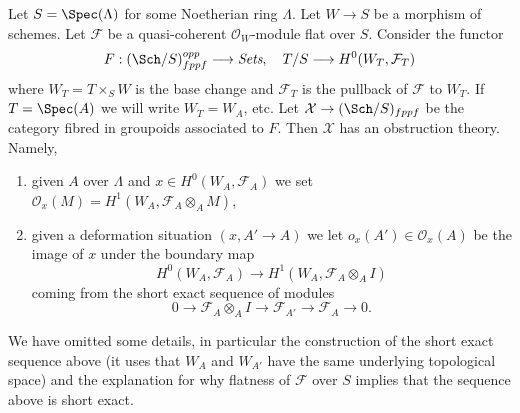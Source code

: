 \begin{example}
\label{example-global-sections}
Let $S = \Spec(\Lambda)$ for some Noetherian ring $\Lambda$.
Let $W \to S$ be a morphism of schemes. Let $\mathcal{F}$
be a quasi-coherent $\mathcal{O}_W$-module flat over $S$.
Consider the functor
$$
F : (\Sch/S)_{fppf}^{opp} \longrightarrow \textit{Sets},
\quad
T/S \longrightarrow H^0(W_T, \mathcal{F}_T)
$$
where $W_T = T \times_S W$ is the base change and $\mathcal{F}_T$ is
the pullback of $\mathcal{F}$ to $W_T$. If $T = \Spec(A)$
we will write $W_T = W_A$, etc. Let $\mathcal{X} \to (\Sch/S)_{fppf}$
be the category fibred in groupoids associated to $F$. Then
$\mathcal{X}$ has an obstruction theory. Namely,
\begin{enumerate}
\item given $A$ over $\Lambda$ and
$x \in H^0(W_A, \mathcal{F}_A)$ we set
$\mathcal{O}_x(M) = H^1(W_A, \mathcal{F}_A \otimes_A M)$,
\item given a deformation situation $(x, A' \to A)$ we let
$o_x(A') \in \mathcal{O}_x(A)$ be the image of $x$ under the boundary map
$$
H^0(W_A, \mathcal{F}_A) \longrightarrow H^1(W_A, \mathcal{F}_A \otimes_A I)
$$
coming from the short exact sequence of modules
$$
0 \to \mathcal{F}_A \otimes_A I \to
\mathcal{F}_{A'} \to \mathcal{F}_A \to 0.
$$
\end{enumerate}
We have omitted some details, in particular the construction of the short
exact sequence above (it uses that $W_A$ and $W_{A'}$ have the same
underlying topological space) and the explanation for why flatness
of $\mathcal{F}$ over $S$ implies that the sequence above is short exact.
\end{example}


